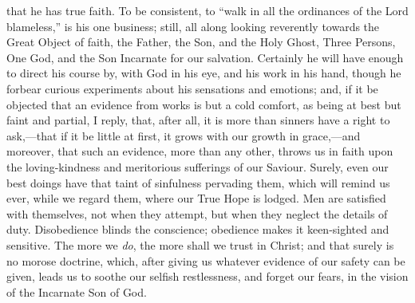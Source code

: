 that he has true faith. To be consistent, to ``walk in all the
ordinances of the Lord blameless,'' is his one business; still, all
along looking reverently towards the Great Object of faith, the Father,
the Son, and the Holy Ghost, Three Persons, One God, and the Son
Incarnate for our salvation. Certainly he will have enough to direct his
course by, with God in his eye, and his work in his hand, though he
forbear curious experiments about his sensations and emotions; and, if
it be objected that an evidence from works is but a cold comfort, as
being at best but faint and partial, I reply, that, after all, it is
more than sinners have a right to ask,—that if it be little at first,
it grows with our growth in grace,—and moreover, that such an
evidence, more than any other, throws us in faith upon the
loving-kindness and meritorious sufferings of our Saviour. Surely, even
our best doings have that taint of sinfulness pervading them, which will
remind us ever, while we regard them, where our True Hope is lodged. Men
are satisfied with themselves, not when they attempt, but when they
neglect the details of duty. Disobedience blinds the conscience;
obedience makes it keen-sighted and sensitive. The more we \emph{do},
the more shall we trust in Christ; and that surely is no morose
doctrine, which, after giving us whatever evidence of our safety can be
given, leads us to soothe our selfish restlessness, and forget our
fears, in the vision of the Incarnate Son of God.

